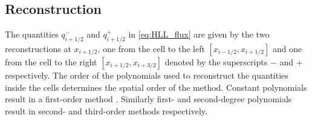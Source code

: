 \documentclass[SingleSpace,12pt,Proceedings]{Serre_ASCE}
\begin{document}
\subsection{Reconstruction} %
The quantities $q^-_{i + 1/2}$ and $q^+_{i + 1/2}$ in \eqref{eq:HLL_flux} are given by the two reconstructions at $x_{i + 1/2}$, one from the cell to the left $[x_{i - 1/2}, x_{i+ 1/2}]$ and one from the cell to the right $[x_{i + 1/2}, x_{i+ 3/2}]$ denoted by the superscripts $-$ and $+$ respectively. The order of the polynomials used to reconstruct the quantities inside the cells determines the spatial order of the method. Constant polynomials result in a first-order method \cite{Godunov-1959-271}. Similarly first- and second-degree polynomials result in second- and third-order methods respectively. 
\end{document}
